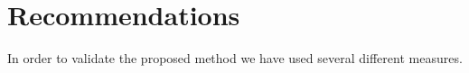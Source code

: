 \section{Recommendations}\label{sec:recommendations}
In order to validate the proposed method we have used several different measures.

